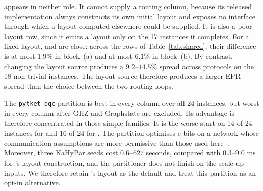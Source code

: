 \begin{table}[t]
\centering
\caption{Geometric-mean EPR by initial-layout source and routing protocol.
Block (a) includes all 24 instances. Block (b) excludes GHZ and Graphstate,
whose very small EPR counts dominate an unweighted geometric mean.
Within each block, bold marks the lowest entry down each
routing-protocol column; it does not compare routers across a row.}
\label{tab:shared}
\setlength{\tabcolsep}{5pt}
\small
{}
\end{table}

\TeleSABRE{} appears in neither role. It cannot supply a routing column,
because its released implementation always constructs its own initial layout and exposes no
interface through which a layout computed elsewhere could be supplied. It is
also a poor layout row, since it emits a layout only on the 17 instances it
completes. For a fixed layout, \dSABRE{} and \PORTER{} are close:
across the rows of Table~\ref{tab:shared}, their difference is at most
$1.9\%$ in block~(a) and at most $6.1\%$ in block~(b). By contrast,
changing the layout source produces a $9.2$--$14.5\%$ spread across
protocols on the 18 non-trivial instances. The layout source therefore
produces a larger EPR spread than the choice between the two routing loops.

The \texttt{pytket-dqc} partition is best in every column over all 24
instances, but worst in every column after GHZ and Graphstate are excluded.
Its advantage is therefore concentrated in those simple families. It is the
worse start on 14 of 24 instances for \dSABRE{} and 16 of 24 for \PORTER{}.
The partition optimises e-bits on a network whose communication assumptions
are more permissive than those used here~\cite{lidsabre}.
Moreover, three KaHyPar seeds cost $0.6$--$627$ seconds, compared with
$0.3$--$9.0$ ms for \PORTER{}'s layout construction, and the partitioner
does not finish on the scale-up inputs. We therefore retain \PORTER{}'s
layout as the default and treat this partition as an opt-in alternative.

